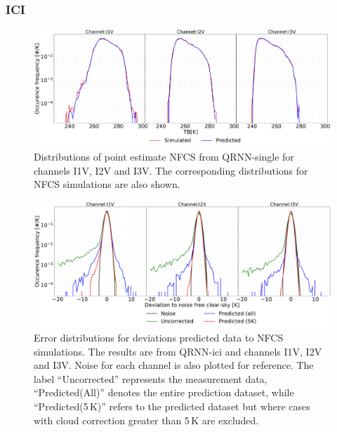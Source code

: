 \documentclass[amt]{copernicus}
\begin{document}
\subsubsection{ICI}
%
\begin{figure}[t]
	\includegraphics[width=\textwidth]{Figures/PDF_predictions_ICI.pdf} 
	\caption{Distributions of point estimate NFCS from QRNN-single for channels I1V, I2V and I3V. The corresponding distributions for NFCS simulations are also shown.}
	\label{fig:PDF_predictions}	
\end{figure}
\begin{figure}[t ]
	\includegraphics[width=\textwidth]{Figures/error_distribution_QRNN-single.pdf} 
	\caption{Error distributions for deviations predicted data to NFCS simulations. The results are from QRNN-ici and channels I1V, I2V and I3V. Noise for each channel is also plotted for reference. The label ``Uncorrected'' represents the measurement data, ``Predicted(All)'' denotes the entire prediction dataset, while ``Predicted(5\,K)'' refers to the predicted dataset but where cases with cloud correction greater than 5\,K are excluded.}
	\label{fig:error_distributions}	
\end{figure}
\end{document}
